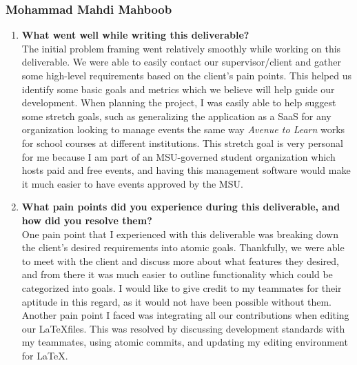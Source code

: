 \documentclass{article}
\begin{document}
\subsubsection*{Mohammad Mahdi Mahboob}
\begin{enumerate}
    \item \textbf{What went well while writing this deliverable? } \\
        The initial problem framing went relatively smoothly while working on this deliverable. We were able to easily
        contact our supervisor/client and gather some high-level requirements based on the client's pain points.
        This helped us identify some basic goals and metrics which we believe will help guide our development.
        When planning the project, I was easily able to help suggest some stretch goals, such as generalizing the
        application as a SaaS for any organization looking to manage events the same way \textit{Avenue to Learn}
        works for school courses at different institutions. This stretch goal is very personal for me because I
        am part of an MSU-governed student organization which hosts paid and free events, and having this management
        software would make it much easier to have events approved by the MSU.
    \item \textbf{What pain points did you experience during this deliverable, and how did you resolve them?} \\
        One pain point that I experienced with this deliverable was breaking down the client's desired requirements
        into atomic goals. Thankfully, we were able to meet with the client and discuss more about what features
        they desired, and from there it was much easier to outline functionality which could be categorized into
        goals. I would like to give credit to my teammates for their aptitude in this regard, as it would not have
        been possible without them. \\
        Another pain point I faced was integrating all our contributions when editing our \LaTeX files. This was
        resolved by discussing development standards with my teammates, using atomic commits, and updating my
        editing environment for \LaTeX.
\end{enumerate}
\end{document}
